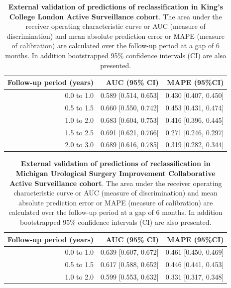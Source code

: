 \begin{table}[!htb]
\small\sf\centering
\caption{\textbf{External validation of predictions of reclassification in King's College London Active Surveillance cohort}. The area under the receiver operating characteristic curve or AUC (measure of discrimination) and mean absolute prediction error or MAPE (measure of calibration) are calculated over the follow-up period at a gap of 6 months. In addition bootstrapped 95\% confidence intervals (CI) are also presented.}
\label{tab:AUC_PE_KCL}
\begin{tabular}{r|r|r}
\hline
\hline
Follow-up period (years) & AUC (95\% CI) & MAPE (95\%CI)\\ 
\hline
0.0 to 1.0 & 0.589 [0.514, 0.653] & 0.430 [0.407, 0.450] \\
0.5 to 1.5 & 0.660 [0.550, 0.742] & 0.453 [0.431, 0.474] \\
1.0 to 2.0 & 0.683 [0.604, 0.753] & 0.416 [0.396, 0.445] \\
1.5 to 2.5 & 0.691 [0.621, 0.766] & 0.271 [0.246, 0.297] \\
2.0 to 3.0 & 0.689 [0.616, 0.785] & 0.319 [0.282, 0.344] \\
\hline
\end{tabular}	
\end{table}



\begin{table}[!htb]
\small\sf\centering
\caption{\textbf{External validation of predictions of reclassification in Michigan Urological Surgery Improvement Collaborative Active Surveillance cohort}. The area under the receiver operating characteristic curve or AUC (measure of discrimination) and mean absolute prediction error or MAPE (measure of calibration) are calculated over the follow-up period at a gap of 6 months. In addition bootstrapped 95\% confidence intervals (CI) are also presented.}
\label{tab:AUC_PE_MUSIC}
\begin{tabular}{r|r|r}
\hline
\hline
Follow-up period (years) & AUC (95\% CI) & MAPE (95\%CI)\\ 
\hline
0.0 to 1.0 & 0.639 [0.607, 0.672] & 0.461 [0.450, 0.469]\\
0.5 to 1.5 & 0.617 [0.588, 0.652] & 0.446 [0.441, 0.453]\\
1.0 to 2.0 & 0.599 [0.553, 0.632] & 0.331 [0.317, 0.348]\\
\hline
\end{tabular}	
\end{table}



